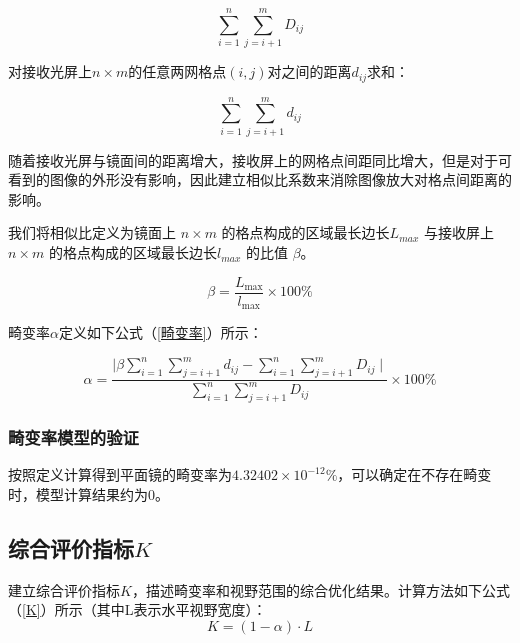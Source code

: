 \documentclass[withoutpreface,bwprint]{cumcmthesis} %
\begin{document}
\begin{equation}
	\sum\limits_{i = 1}^{n}\sum\limits_{j = i + 1}^{m} D_{ij}
\end{equation} 

\par 对接收光屏上$n \times m$的任意两网格点$(i,j)$对之间的距离$d_{ij}$求和：

\begin{equation}
	\sum\limits_{i = 1}^{n}\sum\limits_{j = i + 1}^{m} d_{ij}
\end{equation}

\par 随着接收光屏与镜面间的距离增大，接收屏上的网格点间距同比增大，但是对于可看到的图像的外形没有影响，因此建立相似比系数来消除图像放大对格点间距离的影响。
\par 我们将相似比定义为镜面上 $n \times m$ 的格点构成的区域最长边长$L_{max}$ 与接收屏上 $n \times m$ 的格点构成的区域最长边长$l_{max}$ 的比值 $\beta$。

\begin{equation}
	\beta = \frac{L_{\mathop{max}}}{l_{\mathop{max}}} \times 100 \%
\end{equation}

\par 畸变率$\alpha$定义如下公式（\ref{畸变率}）所示：


\begin{equation}
\label{畸变率}
	\alpha = \frac{\mid \beta \sum\limits_{i = 1}^{n}\sum\limits_{j = i + 1}^{m} d_{ij} - \sum\limits_{i = 1}^{n}\sum\limits_{j = i + 1}^{m} D_{ij} \mid}{\sum\limits_{i = 1}^{n}\sum\limits_{j = i + 1}^{m} D_{ij}} \times 100 \%
\end{equation}

\subsubsection{畸变率模型的验证}

\par 按照定义计算得到平面镜的畸变率为$4.32402\times 10^{-12}\%$，可以确定在不存在畸变时，模型计算结果约为0。


\subsection{综合评价指标$K$}
\par 建立综合评价指标$K$，描述畸变率和视野范围的综合优化结果。计算方法如下公式（\ref{K}）所示（其中L表示水平视野宽度）：
\begin{equation}
\label{K}
	K = (1 - \alpha) \cdot L
\end{equation}
\end{document}
